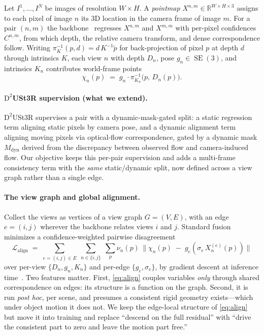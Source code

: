 \documentclass{article}
\newcommand{\R}{\mathbb{R}}
\DeclareMathOperator{\SE}{SE}
\newcommand{\Mdyn}{M_{\mathrm{dyn}}}
\theoremstyle{definition}
\theoremstyle{plain}
\theoremstyle{remark}
\begin{document}
Let $I^1,\dots,I^N$ be images of resolution $W\times H$. A \emph{pointmap}
$X^{n,m}\in\R^{W\times H\times 3}$ assigns to each pixel of image $n$ its
3D location in the camera frame of image $m$. For a pair $(n,m)$ the
backbone~\citep{wang2024dust3r,zhang2025monst3r,han2026enhancing} regresses
$X^{n,m}$ and $X^{m,m}$ with per-pixel confidences $C^{n,m}$, from which
depth, the relative camera transform, and dense correspondence follow.
Writing $\pi_K^{-1}(p,d)=d\,K^{-1}\tilde p$ for back-projection of pixel
$p$ at depth $d$ through intrinsics $K$, each view $n$ with depth $D_n$,
pose $g_n\in\SE(3)$, and intrinsics $K_n$ contributes world-frame points
\begin{equation}
  \chi_n(p) \;=\; g_n \cdot \pi_{K_n}^{-1}\!\big(p,\,D_n(p)\big).
  \label{eq:chi}
\end{equation}

\paragraph{$\mathrm{D}^2$USt3R supervision (what we extend).}
$\mathrm{D}^2$USt3R supervises a pair with a dynamic-mask-gated split: a
static regression term aligning static pixels by camera pose, and a
dynamic alignment term aligning moving pixels via optical-flow
correspondence, gated by a dynamic mask $\Mdyn$ derived from the
discrepancy between observed flow and camera-induced flow. Our objective
keeps this per-pair supervision and adds a multi-frame consistency term
with the \emph{same} static/dynamic split, now defined across a view
graph rather than a single edge.

\paragraph{The view graph and global alignment.}
Collect the views as vertices of a view graph $G=(V,E)$, with an edge
$e=(i,j)$ wherever the backbone relates views $i$ and $j$. Standard fusion
minimizes a confidence-weighted pairwise disagreement
\begin{equation}
  \mathcal{L}_{\mathrm{align}}
  \;=\;
  \sum_{e=(i,j)\in E}\;\sum_{n\in\{i,j\}}\;\sum_{p}
  \nu_n(p)\,
  \big\lVert
     \chi_n(p) \;-\; g_e\!\left(\sigma_e\, X^{(e)}_n(p)\right)
  \big\rVert
  \label{eq:align}
\end{equation}
over per-view $\{D_n,g_n,K_n\}$ and per-edge $\{g_e,\sigma_e\}$, by
gradient descent at inference time~\citep{wang2024dust3r}. Two features
matter. First, \eqref{eq:align} couples variables \emph{only} through
shared correspondence on edges: its structure is a function on the graph.
Second, it is run \emph{post hoc}, per scene, and presumes a consistent
rigid geometry exists---which under object motion it does not. We keep the
edge-local structure of \eqref{eq:align} but move it into training and
replace ``descend on the full residual'' with ``drive the consistent part
to zero and leave the motion part free.''
\end{document}
